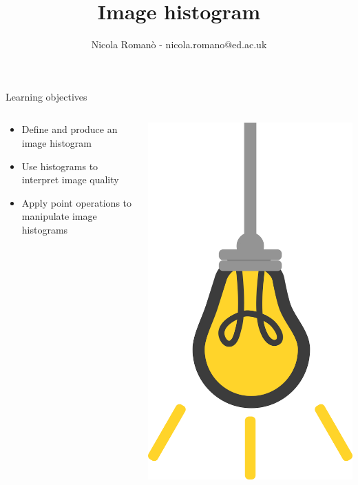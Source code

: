 \documentclass[9pt, aspectratio=169]{beamer}
\author{Nicola Roman\`o - nicola.romano@ed.ac.uk}
\title{Image histogram}
\date{}
\begin{document}

\begin{frame}
    \titlepage
\end{frame}

\begin{frame}
    {Learning objectives}
    \begin{columns}
        \begin{column}{0.8\textwidth}
            \begin{itemize}
                \item Define and produce an image histogram
                \item Use histograms to interpret image quality
                \item Apply point operations to manipulate image histograms
            \end{itemize}
        \end{column}
        \begin{column}{0.2\textwidth}
            \includegraphics[angle=-30, origin=tr, width=1.5\textwidth]{lightbulb.png}

\end{column}
\end{columns}
\end{frame}
\end{document}
